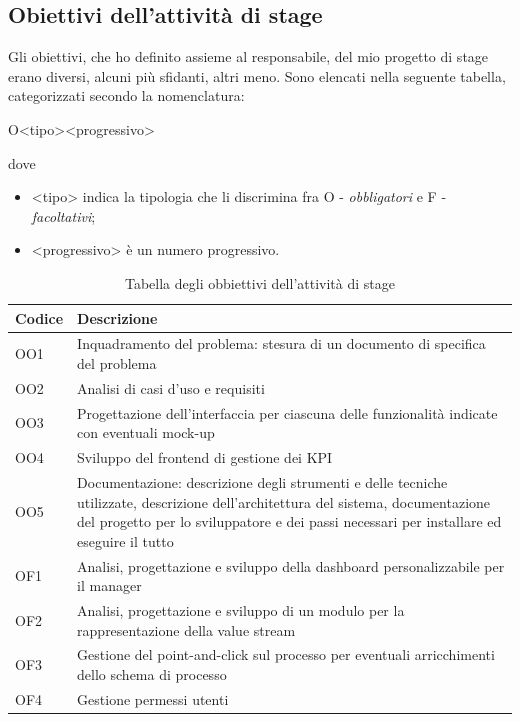\subsection{Obiettivi dell'attività di stage}
\label{ssec:objValue}
Gli obiettivi, che ho definito assieme al responsabile, del mio progetto di stage erano diversi, alcuni più sfidanti, altri meno.
Sono elencati nella seguente tabella, categorizzati secondo la nomenclatura:
\begin{center}
    O<tipo><progressivo>
\end{center}
dove
\begin{itemize}
    \item <tipo> indica la tipologia che li discrimina fra O - \textit{obbligatori} e F - \textit{facoltativi};
    \item <progressivo> è un numero progressivo.
\end{itemize}
\begin{table}[H]
    \centering
    \begin{tabular}{|m{}|m{}|}
        \hline
        \textbf{Codice} & \textbf{Descrizione} \\ \hline
        OO1 & Inquadramento del problema: stesura di un documento di specifica del problema \\ \hline
        OO2 & Analisi di casi d’uso e requisiti\\ \hline
        OO3 & Progettazione dell’interfaccia per ciascuna delle funzionalità indicate con eventuali mock-up \\ \hline
        OO4 & Sviluppo del frontend di gestione dei KPI \\ \hline
        OO5 & Documentazione: descrizione degli strumenti e delle tecniche utilizzate, descrizione dell’architettura del sistema, documentazione del progetto per lo sviluppatore e dei passi necessari per installare ed eseguire il tutto \\ \hline
        OF1 & Analisi, progettazione e sviluppo della dashboard personalizzabile per il manager \\ \hline
        OF2 & Analisi, progettazione e sviluppo di un modulo per la rappresentazione della value stream \\ \hline
        OF3 & Gestione del point-and-click sul processo per eventuali arricchimenti dello schema di processo \\ \hline
        OF4 & Gestione permessi utenti \\ \hline
    \end{tabular}
    \caption{Tabella degli obbiettivi dell'attività di stage}
    \label{tab:obiettivi}
\end{table}
